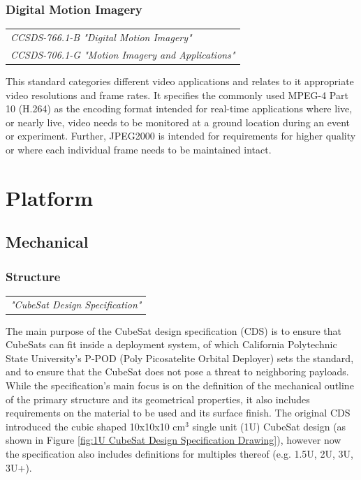\subsubsection{Digital Motion Imagery}

\begin{tabular}{l}
\textit{CCSDS-766.1-B "Digital Motion Imagery" \cite{CCSDS-766.1-B}} \\
\textit{CCSDS-706.1-G "Motion Imagery and Applications" \cite{CCSDS-706.1-G}}
\end{tabular}

This standard categories different video applications and relates to it appropriate video resolutions and frame rates. It specifies the commonly used MPEG-4 Part 10 (H.264) as the encoding format intended for real-time applications where live, or nearly live, video needs to be monitored at a ground location during an event or experiment. Further, JPEG2000 is intended for requirements for higher quality or where each individual frame needs to be maintained intact. 

\section{Platform}

\subsection{Mechanical}

\subsubsection{Structure}

\begin{tabular}{l}
\textit{"CubeSat Design Specification" \cite{cubesat_design_specification}}
\end{tabular}

The main purpose of the CubeSat design specification (CDS) is to ensure that CubeSats can fit inside a deployment system, of which California Polytechnic State University's P-POD (Poly Picosatelite Orbital Deployer) sets the standard, and to ensure that the CubeSat does not pose a threat to neighboring payloads. While the specification's main focus is on the definition of the mechanical outline of the primary structure and its geometrical properties, it also includes requirements on the material to be used and its surface finish. The original CDS introduced the cubic shaped 10x10x10 cm$^{3}$ single unit (1U) CubeSat design (as shown in Figure \ref{fig:1U CubeSat Design Specification Drawing}), however now the specification also includes definitions for multiples thereof (e.g. 1.5U, 2U, 3U, 3U+).

